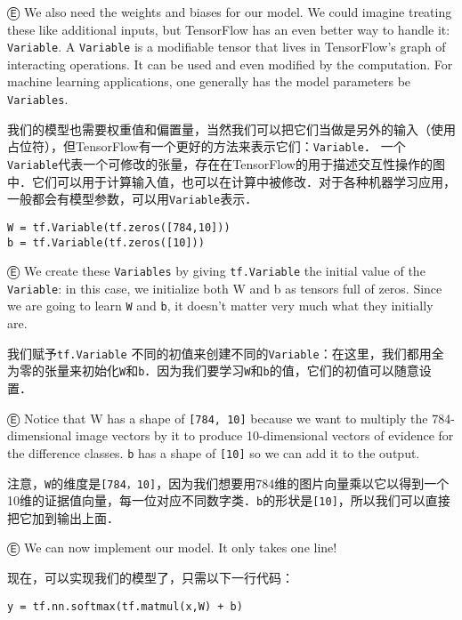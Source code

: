 Ⓔ We also need the weights and biases for our model. We could imagine treating these like additional inputs, but TensorFlow has an even better way to handle it: \lstinline{Variable}. A \lstinline{Variable} is a modifiable tensor that lives in TensorFlow's graph of interacting operations. It can be used and even modified by the computation. For machine learning applications, one generally has the model parameters be \lstinline{Variables}.

我们的模型也需要权重值和偏置量，当然我们可以把它们当做是另外的输入（使用占位符），但TensorFlow有一个更好的方法来表示它们：\lstinline{Variable}． 一个\lstinline{Variable}代表一个可修改的张量，存在在TensorFlow的用于描述交互性操作的图中．它们可以用于计算输入值，也可以在计算中被修改．对于各种机器学习应用，一般都会有模型参数，可以用\lstinline{Variable}表示．

\begin{lstlisting}
W = tf.Variable(tf.zeros([784,10]))
b = tf.Variable(tf.zeros([10]))
\end{lstlisting}

Ⓔ We create these \lstinline{Variables} by giving \lstinline{tf.Variable} the initial value of the \lstinline{Variable}: in this case, we initialize both W and b as tensors full of zeros. Since we are going to learn \lstinline{W} and \lstinline{b}, it doesn't matter very much what they initially are.

我们赋予\lstinline{tf.Variable} 不同的初值来创建不同的\lstinline{Variable}：在这里，我们都用全为零的张量来初始化\lstinline{W}和\lstinline{b}．因为我们要学习\lstinline{W}和\lstinline{b}的值，它们的初值可以随意设置．


Ⓔ Notice that W has a shape of \lstinline{[784, 10]} because we want to multiply the 784-dimensional image vectors by it to produce 10-dimensional vectors of evidence for the difference classes. \lstinline{b} has a shape of \lstinline{[10]} so we can add it to the output.


注意，\lstinline{W}的维度是\lstinline{[784，10]}，因为我们想要用784维的图片向量乘以它以得到一个10维的证据值向量，每一位对应不同数字类．\lstinline{b}的形状是\lstinline{[10]}，所以我们可以直接把它加到输出上面．

Ⓔ We can now implement our model. It only takes one line!

现在，可以实现我们的模型了，只需以下一行代码：

\begin{lstlisting}
y = tf.nn.softmax(tf.matmul(x,W) + b)
\end{lstlisting}

